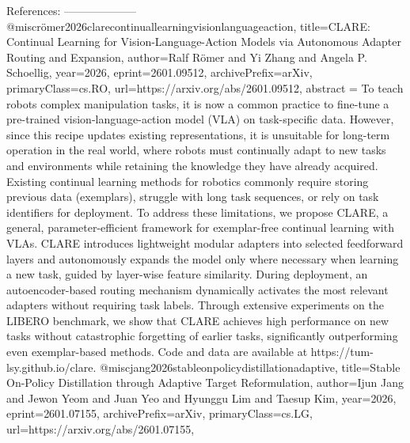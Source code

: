         References:
        --------------------
        @misc{römer2026clarecontinuallearningvisionlanguageaction,
      title={CLARE: Continual Learning for Vision-Language-Action Models via Autonomous Adapter Routing and Expansion}, 
      author={Ralf Römer and Yi Zhang and Angela P. Schoellig},
      year={2026},
      eprint={2601.09512},
      archivePrefix={arXiv},
      primaryClass={cs.RO},
      url={https://arxiv.org/abs/2601.09512},
      abstract = {To teach robots complex manipulation tasks, it is now a common practice to fine-tune a pre-trained vision-language-action model (VLA) on task-specific data. However, since this recipe updates existing representations, it is unsuitable for long-term operation in the real world, where robots must continually adapt to new tasks and environments while retaining the knowledge they have already acquired. Existing continual learning methods for robotics commonly require storing previous data (exemplars), struggle with long task sequences, or rely on task identifiers for deployment. To address these limitations, we propose CLARE, a general, parameter-efficient framework for exemplar-free continual learning with VLAs. CLARE introduces lightweight modular adapters into selected feedforward layers and autonomously expands the model only where necessary when learning a new task, guided by layer-wise feature similarity. During deployment, an autoencoder-based routing mechanism dynamically activates the most relevant adapters without requiring task labels. Through extensive experiments on the LIBERO benchmark, we show that CLARE achieves high performance on new tasks without catastrophic forgetting of earlier tasks, significantly outperforming even exemplar-based methods. Code and data are available at https://tum-lsy.github.io/clare.}
}@misc{jang2026stableonpolicydistillationadaptive,
      title={Stable On-Policy Distillation through Adaptive Target Reformulation}, 
      author={Ijun Jang and Jewon Yeom and Juan Yeo and Hyunggu Lim and Taesup Kim},
      year={2026},
      eprint={2601.07155},
      archivePrefix={arXiv},
      primaryClass={cs.LG},
      url={https://arxiv.org/abs/2601.07155},
}
